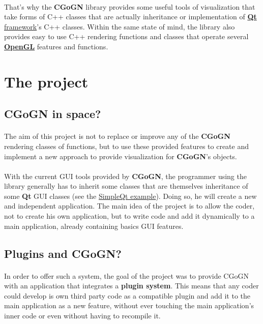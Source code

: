 \documentclass[a4paper]{scrreprt}
\begin{document}
	\paragraph{}
	That's why the \textbf{CGoGN} library provides some useful tools of
	visualization that take forms of C++ classes that are actually inheritance or
	implementation of \href{http://qt-project.org/}{\textbf{Qt} framework}'s C++
	classes. Within the same state of mind, the library also provides easy to use
	C++ rendering functions and classes that operate several
	\href{http://www.opengl.org/}{\textbf{OpenGL}} features and functions.
	
\section{The project}
\subsection{CGoGN in space?}
	\paragraph{}
	The aim of this project is not to replace or improve any of the \textbf{CGoGN}
	rendering classes of functions, but to use these provided features to create
	and implement a new approach to provide visualization for \textbf{CGoGN}'s
	objects.
		
	\paragraph{}
	With the current GUI tools provided by \textbf{CGoGN}, the programmer using the
	library generally has to inherit some classes that are themselves inheritance of
	some \textbf{Qt} GUI classes (see the
	\href{http://cgogn.u-strasbg.fr/Wiki/index.php/Doc_qt}{SimpleQt example}).
	Doing so, he will create a new and independent application.
	The main idea of the project is to allow the coder, not to create his own
	application, but to write code and add it dynamically to a main application,
	already containing basics GUI features.
	
\subsection{Plugins and CGoGN?}
	\paragraph{}
	In order to offer such a system, the goal of the project was to provide CGoGN
	with an application that integrates a \textbf{plugin system}. This means that
	any coder could develop is own third party code as a compatible plugin and add
	it to the main application as a new feature, without ever touching the main
	application's inner code or even without having to recompile it.
	
\end{document}
